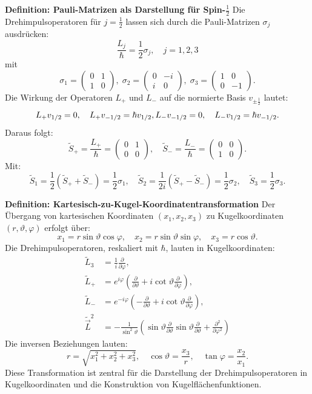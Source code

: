 \documentclass[10pt, letterpaper]{article}
\begin{document}
\textbf{Definition: Pauli-Matrizen als Darstellung für Spin-\(\frac{1}{2}\)}  
Die Drehimpulsoperatoren für \(j = \frac{1}{2}\) lassen sich durch die Pauli-Matrizen \(\sigma_j\) ausdrücken:
$$
\frac{L_j}{\hbar} = \frac{1}{2} \sigma_j, \quad j = 1, 2, 3
$$
mit
$$
\sigma_1 = \begin{pmatrix} 0 & 1 \\ 1 & 0 \end{pmatrix},\;
\sigma_2 = \begin{pmatrix} 0 & -i \\ i & 0 \end{pmatrix},\;
\sigma_3 = \begin{pmatrix} 1 & 0 \\ 0 & -1 \end{pmatrix}.
$$
Die Wirkung der Operatoren \(L_+\) und \(L_-\) auf die normierte Basis \(v_{\pm \frac{1}{2}}\) lautet:
$$
L_+ v_{1/2} = 0, \quad L_+ v_{-1/2} = \hbar v_{1/2}, \\
L_- v_{-1/2} = 0, \quad L_- v_{1/2} = \hbar v_{-1/2}.
$$
Daraus folgt:
$$
\tilde{S}_+ = \frac{L_+}{\hbar} = \begin{pmatrix} 0 & 1 \\ 0 & 0 \end{pmatrix}, \quad
\tilde{S}_- = \frac{L_-}{\hbar} = \begin{pmatrix} 0 & 0 \\ 1 & 0 \end{pmatrix}.
$$
Mit:
$$
\tilde{S}_1 = \frac{1}{2}(\tilde{S}_+ + \tilde{S}_-) = \frac{1}{2} \sigma_1, \quad
\tilde{S}_2 = \frac{1}{2i}(\tilde{S}_+ - \tilde{S}_-) = \frac{1}{2} \sigma_2, \quad
\tilde{S}_3 = \frac{1}{2} \sigma_3.
$$

\textbf{Definition: Kartesisch-zu-Kugel-Koordinatentransformation}  
Der Übergang von kartesischen Koordinaten \((x_1, x_2, x_3)\) zu Kugelkoordinaten \((r, \vartheta, \varphi)\) erfolgt über:
$$
x_1 = r \sin \vartheta \cos \varphi, \quad
x_2 = r \sin \vartheta \sin \varphi, \quad
x_3 = r \cos \vartheta.
$$
Die Drehimpulsoperatoren, reskaliert mit \(\hbar\), lauten in Kugelkoordinaten:
$$
\begin{aligned}
\tilde{L}_3 &= \frac{1}{i} \frac{\partial}{\partial \varphi}, \\
\tilde{L}_{+} &= e^{i \varphi} \left( \frac{\partial}{\partial \vartheta} + i \cot \vartheta \frac{\partial}{\partial \varphi} \right), \\
\tilde{L}_{-} &= e^{-i \varphi} \left( -\frac{\partial}{\partial \vartheta} + i \cot \vartheta \frac{\partial}{\partial \varphi} \right), \\
\tilde{\vec{L}}^2 &= -\frac{1}{\sin^2 \vartheta} \left( \sin \vartheta \frac{\partial}{\partial \vartheta} \sin \vartheta \frac{\partial}{\partial \vartheta} + \frac{\partial^2}{\partial \varphi^2} \right)
\end{aligned}
$$
Die inversen Beziehungen lauten:
$$
r = \sqrt{x_1^2 + x_2^2 + x_3^2}, \quad
\cos \vartheta = \frac{x_3}{r}, \quad
\tan \varphi = \frac{x_2}{x_1}.
$$
Diese Transformation ist zentral für die Darstellung der Drehimpulsoperatoren in Kugelkoordinaten und die Konstruktion von Kugelflächenfunktionen.
\end{document}
